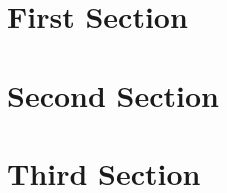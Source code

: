 

\renewcommand\TITLE{Testing myarticle.sty}


\topmatter

\section{First Section}
\lipsum[1-2]

\section{Second Section}
\lipsum[3]

\lipsum[4-5]

\section{Third Section}
\lipsum[6]

\begin{thm}
\lipsum[7]

\lipsum[8]
\end{thm}

\lipsum[9-10]


